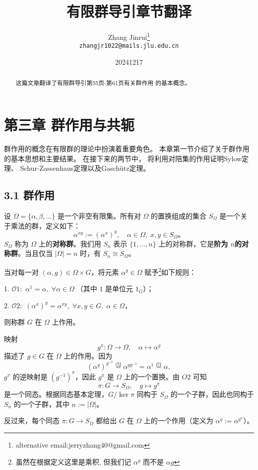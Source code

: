 \documentclass[UTF8]{ctexart}
\title{有限群导引章节翻译}
\author{Zhang Jinrui\thanks{alternative email:jerryzhang40@gmail.com} \\ \texttt{zhangjr1022@mails.jlu.edu.cn}}
\date{20241217}  %
\begin{document}
\maketitle

\begin{abstract}
    这篇文章翻译了有限群导引第55页-第61页有关群作用
    的基本概念。\cite[有限群导引]{Kurzweil_Stellmacher_2004b}
\end{abstract}

\section{第三章 群作用与共轭}
群作用的概念在有限群的理论中扮演着重要角色。
本章第一节介绍了关于群作用的基本思想和主要结果。
在接下来的两节中，
将利用对陪集的作用证明Sylow定理、
Schur-Zassenhaus定理以及Gaschütz定理。
\subsection{3.1 群作用}
设 $\Omega = \{\alpha, \beta, \dots\}$ 是一个非空有限集。所有对 $\Omega$ 的置换组成的集合 $S_\Omega$ 是一个关于乘法的群，定义如下：
$$
    \alpha^{xy} := (\alpha^x)^y, \quad \alpha \in \Omega, \; x, y \in S_\Omega。
$$
$S_\Omega$ 称为 $\Omega$ 上的\textbf{对称群}。我们用 $S_n$ 表示 $\{1, \dots, n\}$ 上的对称群，它是\textbf{阶为 $n$的对称群}。当且仅当 $|\Omega| = n$ 时，有 $S_n \cong S_\Omega$。

当对每一对 $(\alpha, g) \in \Omega \times G$，将元素 $\alpha^g \in \Omega$ 赋予\footnote[1]{虽然在根据定义这里是乘积, 但我们记 $\alpha^g$ 而不是 
$\alpha g$}如下规则：

1. $\mathcal{O}1:$ $ \alpha^1 = \alpha, \; \forall \alpha \in \Omega \;$（其中 $1$ 是单位元 $1_G$）；

2. $\mathcal{O}2:$ $ (\alpha^x)^y = \alpha^{xy}, \; \forall x, y \in G, \; \alpha \in \Omega$，

则称群 $G$ 在 $\Omega$ 上作用。

映射
$$
    g^\pi : \Omega \to \Omega, \quad \alpha \mapsto \alpha^g
$$
描述了 $g \in G$ 在 $\Omega$ 上的作用。因为
$$
    (\alpha^g)^{g^{-1}} \overset{\mathcal{O}2}{=} \alpha^{gg^{-1}} = \alpha^1 \overset{\mathcal{O}1}{=} \alpha,
$$
$g^\pi$ 的逆映射是 $(g^{-1})^\pi$，因此 $g^\pi$ 是 $\Omega$ 上的一个置换。由 $O2$ 可知
$$
    \pi: G \to S_\Omega, \quad g \mapsto g^\pi
$$
是一个同态。根据同态基本定理，$G / \ker \pi$ 同构于 $S_\Omega$ 的一个子群，因此也同构于 $S_n$ 的一个子群，其中 $n := |\Omega|$。

反过来，每个同态 $\pi: G \to S_\Omega$ 都给出 $G$ 在 $\Omega$ 上的一个作用（定义为 $\alpha^g := \alpha^{g^\pi}$）。
\end{document}
